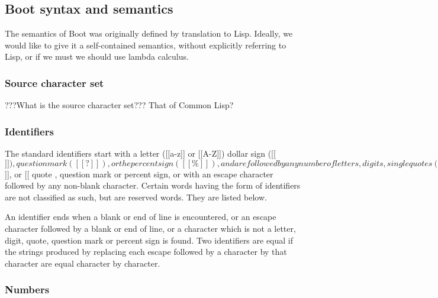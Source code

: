 \documentclass{article}
\begin{document}
 
\subsection{Boot syntax and semantics}

The semantics of Boot was originally defined by translation to Lisp.
Ideally, we would like to give it a self-contained semantics, 
without explicitly referring to Lisp, or if we must we should use
lambda calculus.

\subsubsection{Source character set}
\label{sec:boot:char-set}

???What is the source character set???  That of Common Lisp?

\subsubsection{Identifiers}
\label{sec:boot:identifier}
 
The standard identifiers start with a letter ([[a-z]] or [[A-Z]])
dollar sign ([[$]]), question mark ([[?]]), or the percent sign 
([[\%]]), and are followed by any number of letters, digits, single 
quotes([[']]), question marks, or percent signs.
It is possible however, by using the escape character ([[\_]]), 
to construct identifiers that contain any
characters except the blank or newline character. The rules in this case
are that an escape character followed by any non-blank character
will start an identifier with that character.  Once an identifier
has been started either in this way or by a letter, [[$]], or 
[[%
quote , question mark or percent sign, or with
an escape character followed by any non-blank character.
Certain words having the form of identifiers are not classified as
such, but are reserved words. They are listed below.
 
An identifier ends when a blank or end of line is encountered, or
an escape character followed by a blank or end of line, or a
character which is not a letter, digit, quote, question mark
or percent sign is found. Two identifiers are equal if the
strings produced by replacing each escape followed by a character
by that character are equal character by character.
 
\subsubsection{Numbers}
\label{sec:boot:number}
 
\end{document}
